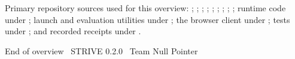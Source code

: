 \documentclass[10pt,a4paper]{article}
\begin{document}
Primary repository sources used for this overview: ; ; ; ; ; ; ; ; ; runtime code under ; launch and evaluation utilities under ; the browser client under ; tests under ; and recorded receipts under .

\vfill
\begin{center}
\textcolor{muted}{\small End of overview \textbullet\ STRIVE 0.2.0 \textbullet\ Team Null Pointer}
\end{center}
\end{document}
